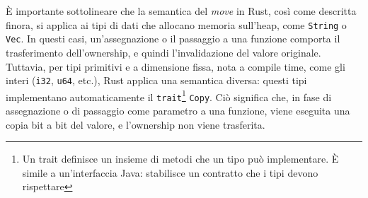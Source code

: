 È importante sottolineare che la semantica del \textit{move} in Rust, così come descritta finora, si applica ai tipi di dati che allocano memoria sull'heap, come \texttt{String} o \texttt{Vec}. In questi casi, un'assegnazione o il passaggio a una funzione comporta il trasferimento dell'ownership, e quindi l'invalidazione del valore originale. Tuttavia, per tipi primitivi e a dimensione fissa, nota a compile time, come gli interi (\texttt{i32}, \texttt{u64}, etc.), Rust applica una semantica diversa: questi tipi implementano automaticamente il \texttt{trait}\footnote{Un trait definisce un insieme di metodi che un tipo può implementare. È simile a un'interfaccia Java: stabilisce un contratto che i tipi devono rispettare} \texttt{Copy}. Ciò significa che, in fase di assegnazione o di passaggio come parametro a una funzione, viene eseguita una copia bit a bit del valore, e l'ownership non viene trasferita.

